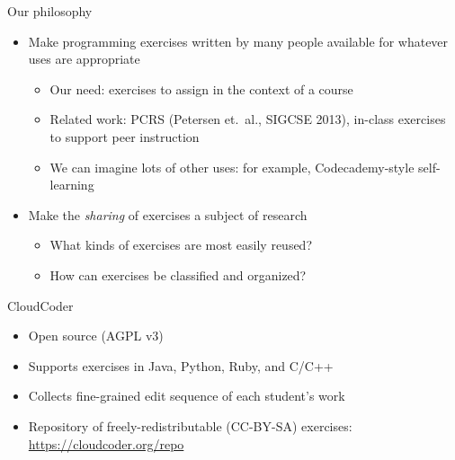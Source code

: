 \documentclass{beamer}
\begin{document}
\begin{frame}{Our philosophy}

\begin{itemize}
  \item Make programming exercises written by many people available
        for whatever uses are appropriate
  \begin{itemize}
    \item Our need: exercises to assign in the context of a course
    \item Related work: PCRS (Petersen et.\ al., SIGCSE 2013), in-class
          exercises to support peer instruction
    \item We can imagine lots of other uses: for example, Codecademy-style
          self-learning
  \end{itemize}
  \item Make the {\em sharing} of exercises a subject of research
  \begin{itemize}
    \item What kinds of exercises are most easily reused?
    \item How can exercises be classified and organized?
  \end{itemize}
\end{itemize}

\end{frame}


%
%
%
%
%
%

\begin{frame}{CloudCoder}

\begin{itemize}
  \item Open source (AGPL v3)
  \item Supports exercises in Java, Python, Ruby, and C/C++
  \item Collects fine-grained edit sequence of each student's work
  \item Repository of freely-redistributable (CC-BY-SA) exercises:
        \url{https://cloudcoder.org/repo}
\end{itemize}

\end{frame}
\end{document}
